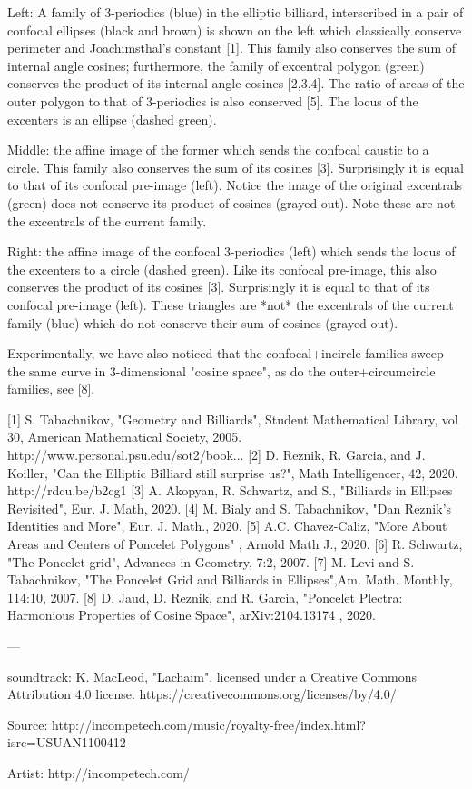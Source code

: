 Left: A family of 3-periodics (blue) in the elliptic billiard, interscribed in a pair of confocal ellipses (black and brown) is shown on the left which classically conserve perimeter and Joachimsthal's constant [1].  This family also conserves the sum of internal angle cosines; furthermore, the family of excentral polygon (green) conserves the product of its internal angle cosines [2,3,4]. The ratio of areas of the outer polygon to that of 3-periodics is also conserved [5]. The locus of the excenters is an ellipse (dashed green). 

Middle: the affine image of the former which sends the confocal caustic to a circle. This family also conserves the sum of its cosines [3]. Surprisingly it is equal to that of its confocal pre-image (left). Notice the image of the original excentrals (green) does not conserve its product of cosines (grayed out). Note these are not the excentrals of the current family.

Right: the affine image of the confocal 3-periodics (left) which sends the locus of the excenters to a circle (dashed green). Like its confocal pre-image, this also conserves the product of its cosines [3]. Surprisingly it is equal to that of its confocal pre-image (left). These triangles are *not* the excentrals of the current family (blue) which do not conserve their sum of cosines (grayed out).

Experimentally, we have also noticed that the confocal+incircle families sweep the same curve in 3-dimensional "cosine space", as do the outer+circumcircle families, see [8].

[1] S. Tabachnikov, "Geometry and Billiards", Student Mathematical Library, vol 30, American Mathematical Society, 2005. http://www.personal.psu.edu/sot2/book...​
[2] D. Reznik, R. Garcia, and J. Koiller, "Can the Elliptic Billiard still surprise us?", Math Intelligencer, 42, 2020. http://rdcu.be/b2cg1​
[3] A. Akopyan, R. Schwartz, and S., "Billiards in Ellipses Revisited", Eur. J. Math, 2020. 
[4] M. Bialy and S. Tabachnikov, "Dan Reznik's Identities and More",
Eur. J. Math., 2020.
[5] A.C. Chavez-Caliz, "More About Areas and Centers of Poncelet Polygons" , Arnold Math J., 2020.
[6] R. Schwartz,  "The Poncelet grid", Advances in Geometry, 7:2, 2007.
[7] M. Levi and  S. Tabachnikov, "The Poncelet Grid and Billiards in Ellipses",Am. Math. Monthly,  114:10, 2007.
[8] D. Jaud, D. Reznik, and R. Garcia, "Poncelet Plectra: Harmonious Properties of Cosine Space", arXiv:2104.13174 , 2020.

---

soundtrack: K. MacLeod, "Lachaim", licensed under a Creative Commons Attribution 4.0 license. https://creativecommons.org/licenses/by/4.0/

Source: http://incompetech.com/music/royalty-free/index.html?isrc=USUAN1100412

Artist: http://incompetech.com/